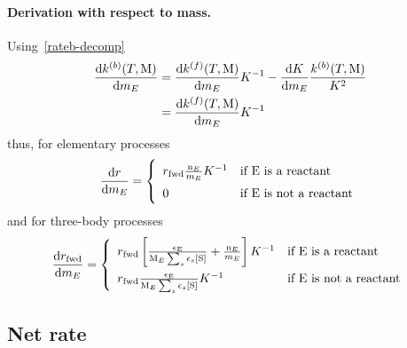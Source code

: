 \paragraph{Derivation with respect to mass.}
Using~\ref{rateb-decomp}
\begin{equation}
\begin{split}
\doverdm[E]{\rateConsb} &= \doverdm[E]{\rateConsf}\Eqconst^{-1} - \doverdm[E]{\Eqconst}\frac{\rateConsb}{\Eqconst^{2}} \\
                        &= \doverdm[E]{\rateConsf}\Eqconst^{-1}
\end{split}
\label{rateb-decomp-m}
\end{equation}
thus, for elementary processes
\begin{equation}
\doverdm[E]{\rate} = \left\{\begin{array}{ll}
                        \ratef \frac{\scoefabs[E]}{\mass[E]} \Eqconst^{-1} & \text{if \ce{E} is a reactant} \\
                        0                                                  & \text{if \ce{E} is not a reactant} \\
                      \end{array}\right.
\end{equation}
and for three-body processes
\begin{equation}
\renewcommand{\arraystretch}{1.5}
\doverdm[E]{\ratef} = \left\{\begin{array}{ll}
                        \ratef \left[\frac{\epsilon_{\ce{E}}}{\Mm[E]\threeBody} + \frac{\scoefabs[E]}{\mass[E]} \right] \Eqconst^{-1}
                                                & \text{if \ce{E} is a reactant} \\
                        \ratef \frac{\epsilon_{\ce{E}}}{\Mm[E]\threeBody} \Eqconst^{-1}
                                                & \text{if \ce{E} is not a reactant} \\
                      \end{array}\right.
\end{equation}

\subsection{Net rate}

